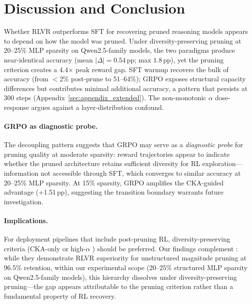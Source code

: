 \section{Discussion and Conclusion}
\label{sec:conclusion}

Whether RLVR outperforms SFT for recovering pruned reasoning models appears to depend on how the model was pruned.
Under diversity-preserving pruning at 20--25\% MLP sparsity on Qwen2.5-family models, the two paradigms produce near-identical accuracy (mean $|\Delta| {=} 0.54$\,pp; max $1.8$\,pp), yet the pruning criterion creates a 4.4$\times$ peak reward gap.
SFT warmup recovers the bulk of accuracy (from $<$2\% post-prune to 51--64\%); GRPO exposes structural capacity differences but contributes minimal additional accuracy, a pattern that persists at 300 steps (Appendix~\ref{sec:appendix_extended}).
The non-monotonic $\alpha$ dose-response argues against a layer-distribution confound.

\paragraph{GRPO as diagnostic probe.}
The decoupling pattern suggests that GRPO may serve as a \emph{diagnostic probe} for pruning quality at moderate sparsity: reward trajectories appear to indicate whether the pruned architecture retains sufficient diversity for RL exploration---information not accessible through SFT, which converges to similar accuracy at 20--25\% MLP sparsity.
At 15\% sparsity, GRPO amplifies the CKA-guided advantage ($+$1.51\,pp), suggesting the transition boundary warrants future investigation.

\paragraph{Implications.}
For deployment pipelines that include post-pruning RL, diversity-preserving criteria (CKA-only or high-$\alpha$ \rasp{}) should be preferred.
Our findings complement \citet{selfhealing2025}: while they demonstrate RLVR superiority for unstructured magnitude pruning at 96.5\% retention, within our experimental scope (20--25\% structured MLP sparsity on Qwen2.5-family models), this hierarchy dissolves under diversity-preserving pruning---the gap appears attributable to the pruning criterion rather than a fundamental property of RL recovery.
